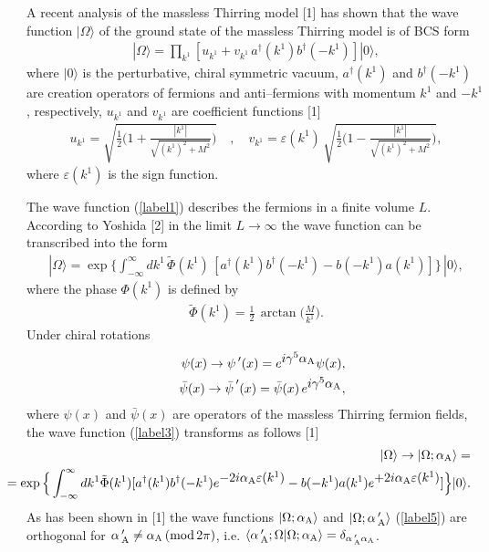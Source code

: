 \documentclass[a4paper,12pt] {article}
\begin{document}
\hspace{0.2in} A recent analysis of the massless Thirring model [1] has
shown that the wave function $|\Omega\rangle$ of the ground state of
the massless Thirring model is of BCS form
%
\begin{eqnarray}\label{label1}
|\Omega\rangle = \prod_{\textstyle k^1}[u_{\textstyle k^1} +
 v_{\textstyle k^1}\, a^{\dagger}(k^1)b^{\dagger}(-k^1)]|0\rangle,
\end{eqnarray}
%
where $|0\rangle$ is the perturbative, chiral symmetric vacuum,
$a^{\dagger}(k^1)$ and $b^{\dagger}(-k^1)$ are creation operators of
fermions and anti--fermions with momentum $k^1$ and $-k^1$,
respectively, $u_{\textstyle k^1}$ and $ v_{\textstyle k^1}$ are
coefficient functions  [1]
%
\begin{eqnarray}\label{label2}
u_{\textstyle k^1} = \sqrt{\frac{1}{2}\Bigg( 1 +
\frac{|k^1|}{\sqrt{(k^1)^2 + M^2}}\Bigg)}\quad,\quad v_{\textstyle
k^1} = \varepsilon(k^1)\,\sqrt{\frac{1}{2}\Bigg( 1 -
\frac{|k^1|}{\sqrt{(k^1)^2 + M^2}}\Bigg)},
\end{eqnarray}
%
where $\varepsilon(k^1)$ is the sign function.

The wave function (\ref{label1}) describes the fermions in a finite
volume $L$. According to Yoshida [2] in the limit $L\to \infty$ the
wave function can be transcribed into the form
%
\begin{eqnarray}\label{label3}
|\Omega\rangle = \exp\Big\{
 \int^{\infty}_{-\infty}dk^1\,\tilde{\Phi}(k^1)\,
 [a^{\dagger}(k^1)b^{\dagger}(-k^1) - b(-k^1)a(k^1)]\Big\}\,|0\rangle,
\end{eqnarray}
%
where the phase $\Phi(k^1)$ is defined by
%
\begin{eqnarray}\label{label4}
 \tilde{\Phi}(k^1) = \frac{1}{2}\,\arctan\Big(\frac{M}{k^1}\Big).
\end{eqnarray}
%
Under chiral rotations
%
\begin{eqnarray}\label{label5}
&&\psi(x) \to {\psi\,}'(x) = e^{\textstyle
i\gamma^5\alpha_{\rm A}}\psi(x),\nonumber\\
&&\bar{\psi}(x) \to
{\bar{\psi}\,}'(x) = \bar{\psi}(x)\,e^{\textstyle
i\gamma^5\alpha_{\rm A}}, 
\end{eqnarray}
%
where $\psi(x)$ and $\bar{\psi}(x)$ are operators of the massless
Thirring fermion fields, the wave function (\ref{label3}) transforms
as follows [1]
%
\begin{eqnarray}\label{label6}
\hspace{-0.5in}&&|\Omega\rangle \to |\Omega; \alpha_{\rm A}\rangle
=\nonumber\\ \hspace{-0.5in}&&=\exp\Big\{
\int^{\infty}_{-\infty}dk^1\tilde{\Phi}(k^1)[a^{\dagger}(k^1)
b^{\dagger}(-k^1)e^{\textstyle -2i\alpha_{\rm A}\varepsilon(k^1)} -
b(-k^1) a(k^1)e^{\textstyle +2i\alpha_{\rm A}\varepsilon(k^1)}]\Big\}
|0\rangle.
\end{eqnarray}
%
As has been shown in [1] the wave functions $|\Omega; \alpha_{\rm
A}\rangle$ and $|\Omega; \alpha\,'_{\rm A}\rangle$ (\ref{label5}) are
orthogonal for $\alpha\,'_{\rm A} \neq \alpha_{\rm A}\,({\rm
mod}\,2\pi)$, i.e. $\langle \alpha\,'_{\rm A}; \Omega|\Omega;
\alpha_{\rm A}\rangle = \delta_{\alpha\,'_{\rm A} \alpha_{\rm A}}$.
\end{document}

